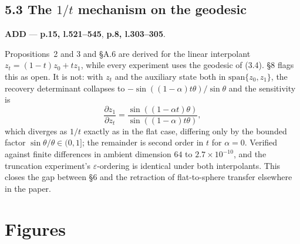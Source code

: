 \documentclass[11pt]{article}
\newcommand{\ADD}{\textcolor{add}{\textbf{ADD}}}
\newcommand{\pl}[2]{\textbf{p.#1, l.#2}}
\begin{document}
\subsection*{5.3 The $1/t$ mechanism on the geodesic}

\ADD{} --- \pl{15}{521--545}, \pl{8}{303--305}.

Propositions~2 and 3 and \S A.6 are derived for the linear interpolant
$z_t=(1-t)z_0+tz_1$, while every experiment uses the geodesic of (3.4). \S8 flags this as open.
It is not: with $z_t$ and the auxiliary state both in $\mathrm{span}\{z_0,z_1\}$, the recovery
determinant collapses to $-\sin((1-\alpha)t\theta)/\sin\theta$ and the sensitivity is
\[
\frac{\partial z_1}{\partial z_t}=\frac{\sin((1-\alpha t)\theta)}{\sin((1-\alpha)t\theta)},
\]
which diverges as $1/t$ exactly as in the flat case, differing only by the bounded factor
$\sin\theta/\theta\in(0,1]$; the remainder is second order in $t$ for $\alpha=0$. Verified against
finite differences in ambient dimension $64$ to $2.7\times10^{-10}$, and the truncation
experiment's $\varepsilon$-ordering is identical under both interpolants. This closes the gap
between \S6 and the retraction of flat-to-sphere transfer elsewhere in the paper.

\section{Figures}
\end{document}
